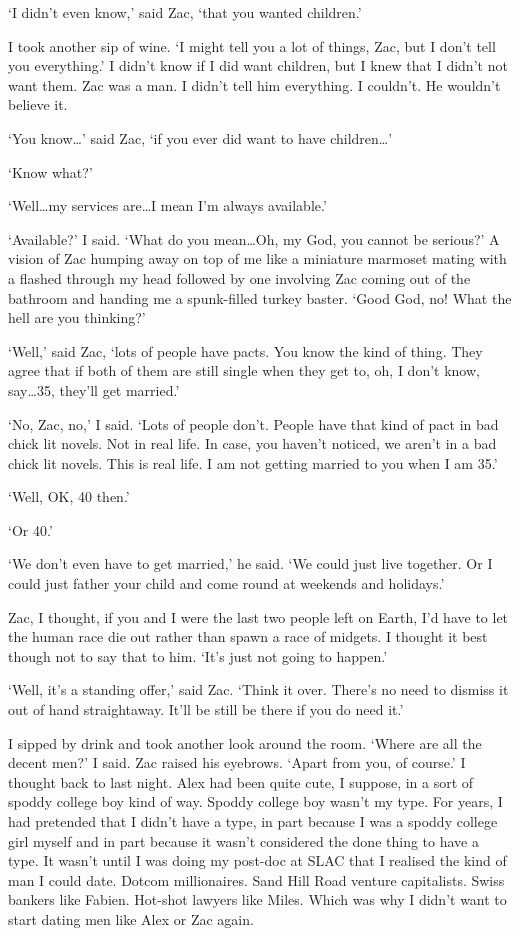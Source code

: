 `I didn't even know,' said Zac, `that you wanted children.'

I took another sip of wine. `I might tell you a lot of things, Zac,
but I don't tell you everything.' I didn't know if I did want
children, but I knew that I didn't {\twelveit not\/} want them. Zac was a man. I
didn't tell him everything. I couldn't. He wouldn't believe it.

`You know\dots' said Zac, `if you ever did want to have
children\dots'

`Know what?'

`Well\dots my services are\dots I mean I'm always available.'

`Available?' I said. `What do you mean\dots Oh, my God, you cannot
be serious?' A vision of Zac humping away on top of me like a miniature marmoset mating with a  flashed
through my head followed by one involving Zac coming out of the
bathroom and handing me a spunk-filled turkey baster. `Good God, no! What
the hell are you thinking?'

`Well,' said Zac, `lots of people have pacts. You know the kind of
thing. They agree that if both of them are still single when they
get to, oh, I don't know, say\dots 35, they'll get married.'

`No, Zac, no,' I said. `Lots of people don't. People have that kind
of pact in bad chick lit novels. Not in real life. In case, you
haven't noticed, we aren't in a bad chick lit novels. This is real life. I am not getting married to you
when I am 35.'

`Well, OK, 40 then.'

`Or 40.'

`We don't even have to get married,' he said. `We could just live together. Or I could just father
your child and come round at weekends and holidays.'

Zac, I thought, if you and I were the last two people left on Earth,
I'd have to let the human race die out rather than spawn a race of midgets.
I thought it best though not to say that to him. `It's just not
going to happen.'

`Well, it's a standing offer,' said Zac. `Think it over. There's no
need to dismiss it out of hand straightaway. It'll be still be there if you do need it.'

I sipped by drink and took another look around the room. `Where are
all the decent men?' I said. Zac raised his eyebrows. `Apart from
you, of course.' I thought back to last night. Alex had been quite
cute, I suppose, in a sort of spoddy college boy kind of way. Spoddy
college boy wasn't my type. For years, I had pretended that I didn't
have a type, in part because I was a spoddy college girl myself and
in part because it wasn't considered the done thing to have a type.
It wasn't until I was doing my post-doc at SLAC that I realised the
kind of man I could date. Dotcom millionaires. Sand Hill Road
venture capitalists. Swiss bankers like Fabien. Hot-shot lawyers like Miles. Which was why I
didn't want to start dating men like Alex or Zac again.

